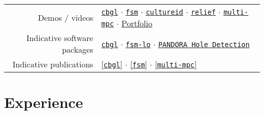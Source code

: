 \documentclass[a4paper,10pt,twoside]{article}
\begin{document}
\vspace{+0.1cm}
\begin{tabular}{rl}

  Demos / videos & \href{https://www.youtube.com/watch?v=xaDKjI0WkDc}{\texttt{cbgl}} $\cdot$ \href{https://www.youtube.com/watch?v=hB4qsHCEXGI}{\texttt{fsm}} $\cdot$ \href{https://cultureid.web.auth.gr/?page\_id=200&lang=en}{\texttt{cultureid}} $\cdot$ \href{https://relief.web.auth.gr/}{\texttt{relief}} $\cdot$ \href{https://www.youtube.com/watch?v=937OZez1iN8}{\texttt{multi-mpc}} $\cdot$ \href{https://docs.google.com/viewer?url=https://raw.githubusercontent.com/li9i/portfolio/master/portfolio.pdf}{Portfolio} \\

  Indicative software packages &
  \href{https://github.com/li9i/cbgl}{\texttt{cbgl}} $\cdot$
  \href{https://github.com/li9i/fsm-lo}{\texttt{fsm-lo}} $\cdot$
  \href{https://github.com/li9i/pandora\_vision\_2014/tree/hydro-devel/pandora\_vision\_hole\_detector}{\texttt{PANDORA Hole Detection}} \\

  Indicative publications &
  \href{https://ieeexplore.ieee.org/abstract/document/10802235}{[\texttt{cbgl}]} $\cdot$
  \href{https://ieeexplore.ieee.org/abstract/document/9981228}{[\texttt{fsm}]} $\cdot$
  \href{https://www.tandfonline.com/doi/full/10.1080/00207179.2018.1514129}{[\texttt{multi-mpc}]}

\end{tabular}

\section{\textbf{Experience}}
\end{document}
